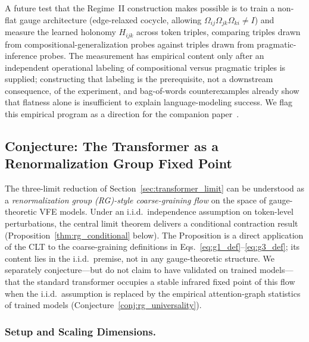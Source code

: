 \documentclass[twoside,11pt]{article}
\begin{document}
A future test that the Regime~II construction makes possible is to train a non-flat gauge architecture (edge-relaxed cocycle, allowing $\Omega_{ij}\Omega_{jk}\Omega_{ki} \neq I$) and measure the learned holonomy $H_{ijk}$ across token triples, comparing triples drawn from compositional-generalization probes against triples drawn from pragmatic-inference probes. The measurement has empirical content only after an independent operational labeling of compositional versus pragmatic triples is supplied; constructing that labeling is the prerequisite, not a downstream consequence, of the experiment, and bag-of-words counterexamples already show that flatness alone is insufficient to explain language-modeling success. We flag this empirical program as a direction for the companion paper~\citep{Dennis2025it}.

\subsection{Conjecture: The Transformer as a Renormalization Group Fixed Point}
\label{sec:rg_universality}

The three-limit reduction of Section~\ref{sec:transformer_limit} can be understood as a \emph{renormalization group (RG)-style coarse-graining flow} on the space of gauge-theoretic VFE models. Under an i.i.d.\ independence assumption on token-level perturbations, the central limit theorem delivers a conditional contraction result (Proposition~\ref{thm:rg_conditional} below). The Proposition is a direct application of the CLT to the coarse-graining definitions in Eqs.~\eqref{eq:g1_def}--\eqref{eq:g3_def}; its content lies in the i.i.d.\ premise, not in any gauge-theoretic structure. We separately conjecture---but do not claim to have validated on trained models---that the standard transformer occupies a stable infrared fixed point of this flow when the i.i.d.\ assumption is replaced by the empirical attention-graph statistics of trained models (Conjecture~\ref{conj:rg_universality}).

\subsubsection{Setup and Scaling Dimensions.}
\end{document}
